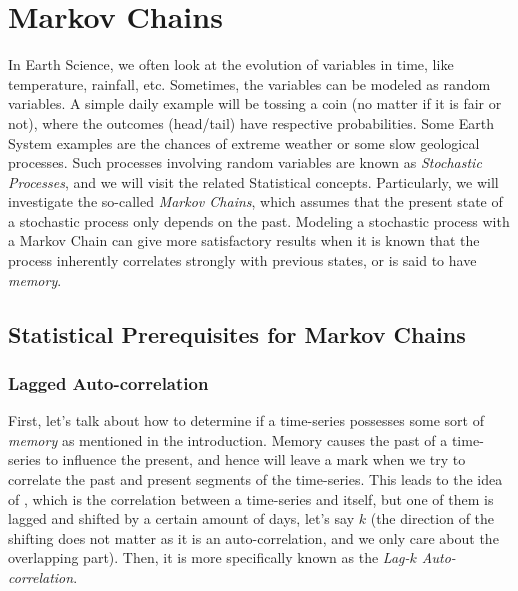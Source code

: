 \chapter{Markov Chains}

In Earth Science, we often look at the evolution of variables in time, like temperature, rainfall, etc. Sometimes, the variables can be modeled as random variables. A simple daily example will be tossing a coin (no matter if it is fair or not), where the outcomes (head/tail) have respective probabilities. Some Earth System examples are the chances of extreme weather or some slow geological processes. Such processes involving random variables are known as \textit{Stochastic Processes}, and we will visit the related Statistical concepts. Particularly, we will investigate the so-called \textit{Markov Chains}, which assumes that the present state of a stochastic process only depends on the past. Modeling a stochastic process with a Markov Chain can give more satisfactory results when it is known that the process inherently correlates strongly with previous states, or is said to have \textit{memory}.

\section{Statistical Prerequisites for Markov Chains}

\subsection{Lagged Auto-correlation}

First, let's talk about how to determine if a time-series possesses some sort of \textit{memory} as mentioned in the introduction. Memory causes the past of a time-series to influence the present, and hence will leave a mark when we try to correlate the past and present segments of the time-series. This leads to the idea of , which is the correlation between a time-series and itself, but one of them is lagged and shifted by a certain amount of days, let's say $k$ (the direction of the shifting does not matter as it is an auto-correlation, and we only care about the overlapping part). Then, it is more specifically known as the \textit{Lag-$k$ Auto-correlation}.

